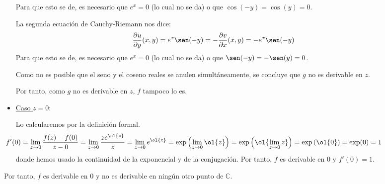 \documentclass[12pt]{article}
\renewcommand{\Re}{\operatorname{Re}} %
\renewcommand{\Im}{\operatorname{Im}}
\begin{document}
\begin{ejercicio}[3 puntos]
\begin{description}
\begin{itemize}
                Para que esto se de, es necesario que $e^x=0$ (lo cual no se da) o que $\cos(-y)=\cos(y)=0$.

                La segunda ecuación de Cauchy-Riemann nos dice:
                \begin{align*}
                    \frac{\partial u}{\partial y}(x,y) = e^x\sen(-y)
                    = -\frac{\partial v}{\partial x}(x,y) = -e^x\sen(-y)
                \end{align*}
                Para que esto se de, es necesario que $e^x=0$ (lo cual no se da) o que $\sen(-y)=-\sen(y)=0$.

                Como no es posible que el seno y el coseno reales se anulen simultáneamente, se concluye que $g$ no es derivable en $z$.

                \begin{comment}
                \item[Otra forma]~
                
                Calculemos $\ol{g(z)}$:
                \begin{align*}
                    \ol{g(z)} &= \ol{e^{\ol{z}}} = e^{\Re z}\left(\cos(-\Im z) - i\sen(-\Im z)\right)
                    =\\&= e^{\Re z}\left(\cos(\Im z) + i\sen(\Im z)\right)
                    = e^z\qquad \forall z\in \mathbb{C}
                \end{align*}

                Por tanto, supuesto que $g$ es holomorfa en $\bb{C}^*$, como $\ol{g}$ también lo es, entonces 
                \end{comment}
            
            
            Por tanto, como $g$ no es derivable en $z$, $f$ tampoco lo es.

            \item{ \ul{Caso $z=0$}:}
            
            Lo calcularemos por la definición formal.
            \begin{equation*}
                \hspace{-2cm}f'(0) = \lim_{z\to 0} \frac{f(z)-f(0)}{z-0} = \lim_{z\to 0} \frac{z e^{\ol{z}}}{z} = \lim_{z\to 0} e^{\ol{z}} = \exp\left(\lim_{z\to 0} \ol{z}\right) = \exp\left(\ol{\lim_{z\to 0} z}\right) = \exp\left(\ol{0}\right) = \exp(0) = 1
            \end{equation*}
            donde hemos usado la continuidad de la exponencial y de la conjugación. Por tanto, $f$ es derivable en $0$ y $f'(0)=1$.
        \end{itemize}
        
        Por tanto, $f$ es derivable en $0$ y no es derivable en ningún otro punto de $\mathbb{C}$.        
        \end{description}
    \end{ejercicio}
\end{document}
